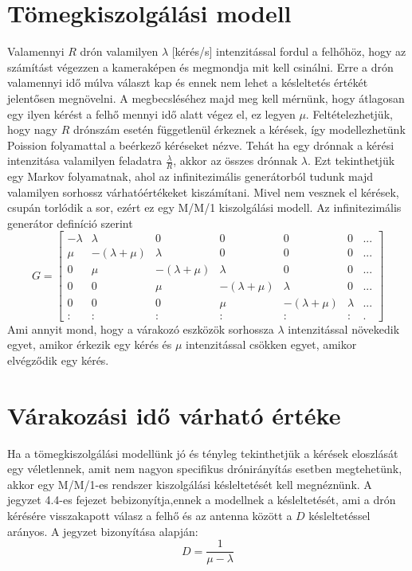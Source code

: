 \section{Tömegkiszolgálási modell}
Valamennyi $R$ drón valamilyen $\lambda$ [kérés/s] intenzitással fordul a felhőhöz, hogy az számítást végezzen a kameraképen és megmondja mit kell csinálni. Erre a drón valamennyi idő múlva választ kap és ennek nem lehet a késleltetés értékét jelentősen megnövelni. A megbecsléséhez majd meg kell mérnünk, hogy átlagosan egy ilyen kérést a felhő mennyi idő alatt végez el, ez legyen $\mu$.
Feltételezhetjük, hogy nagy $R$ drónszám esetén függetlenül érkeznek a kérések, így modellezhetünk Poission folyamattal a beérkező kéréseket nézve. Tehát ha egy drónnak a kérési intenzitása valamilyen feladatra $\frac{\lambda}{R}$, akkor az összes drónnak $\lambda$.
Ezt tekinthetjük egy Markov folyamatnak, ahol az infinitezimális generátorból tudunk majd valamilyen sorhossz várhatóértékeket kiszámítani. Mivel nem vesznek el kérések, csupán torlódik a sor, ezért ez egy M/M/1 kiszolgálási modell. \cite{toki}
Az infinitezimális generátor definíció szerint
\begin{equation} G =
\begin{bmatrix}
-\lambda & \lambda & 0 & 0 & 0 & 0 & ... \\
\mu & -(\lambda+\mu) & \lambda & 0 & 0 & 0 & ... \\
0 & \mu & -(\lambda+\mu) & \lambda & 0 & 0 & ... \\
0 & 0 & \mu & -(\lambda+\mu) & \lambda & 0 & ... \\
0 & 0 & 0 & \mu & -(\lambda+\mu) & \lambda & ... \\
: & : & : & : & : & : & .
\end{bmatrix}
\end{equation}
Ami annyit mond, hogy a várakozó eszközök sorhossza $\lambda$ intenzitással növekedik egyet, amikor érkezik egy kérés és $\mu$ intenzitással csökken egyet, amikor elvégződik egy kérés.

\section{Várakozási idő várható értéke}
Ha a tömegkiszolgálási modellünk jó és tényleg tekinthetjük a kérések eloszlását egy véletlennek, amit nem nagyon specifikus drónirányítás esetben megtehetünk, akkor egy M/M/1-es rendszer kiszolgálási késleltetését kell megnéznünk. A \cite{toki} jegyzet 4.4-es fejezet bebizonyítja,ennek a modellnek a késleltetését, ami a drón kérésére visszakapott válasz a felhő és az antenna között a $D$ késleltetéssel arányos. A jegyzet bizonyítása alapján: \[ D = \frac{1}{\mu - \lambda} \]
